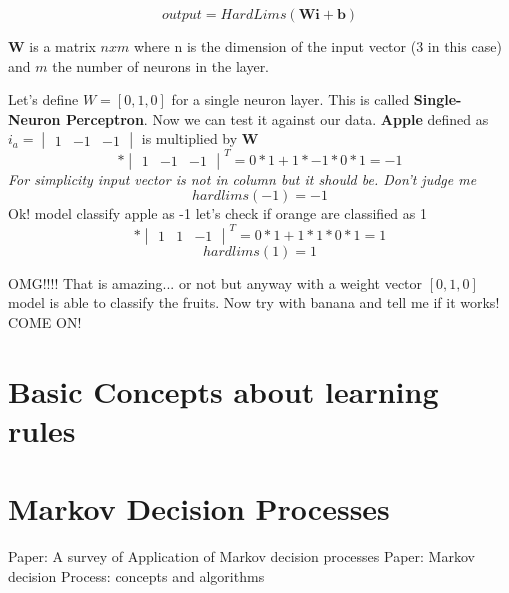 \documentclass[12pt,a4paper,twoside,openright]{scrbook}
\begin{document}
\begin{equation}
output = HardLims(\textbf{W}\textbf{i} + \textbf{b})
\end{equation}

\textbf{W} is a matrix $nxm$ where n is the dimension of the input vector (3 in this case) and $m$ the number of neurons in the layer.

Let's define $W = [0, 1, 0]$ for a single neuron layer. This is called \textbf{Single-Neuron Perceptron}. Now we can test it against our data.
\newline
\textbf{Apple} defined as  $i_a = \begin{vmatrix}
1 & -1 & -1
\end{vmatrix}$ is multiplied by \textbf{W}
\begin{equation}
[0, 1, 0] * \begin{vmatrix}
1 & -1 & -1
\end{vmatrix}^T = 0*1 + 1*-1 * 0*1 = -1
\end{equation}
\textit{For simplicity input vector is not in column but it should be. Don't judge me}
\begin{equation}
hardlims(-1) = -1
\end{equation}
Ok! model classify apple as -1 let's check if orange are classified as 1
\begin{equation}
[0, 1, 0] * \begin{vmatrix}
1 & 1 & -1
\end{vmatrix}^T = 0*1 + 1*1 * 0*1 = 1
\end{equation}
\begin{equation}
hardlims(1) = 1
\end{equation}

OMG!!!! That is amazing... or not but anyway with a weight vector $[0, 1, 0]$ model is able to classify the fruits. Now try with banana and tell me if it works! COME ON!

\chapter{Basic Concepts about learning rules}


\chapter{Markov Decision Processes}
Paper: A survey of Application of Markov decision processes
Paper: Markov decision Process: concepts and algorithms
\end{document}

